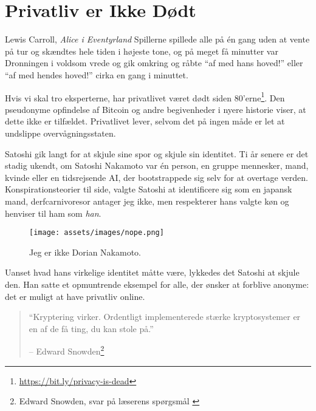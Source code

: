 \chapter{Privatliv er Ikke Dødt}
\label{les:19}

\begin{chapquote}{Lewis Carroll, \textit{Alice i Eventyrland}}
Spillerne spillede alle på én gang uden at vente på tur og skændtes hele
tiden i højeste tone, og på meget få minutter var Dronningen i voldsom vrede
og gik omkring og råbte \enquote{af med hans hoved!} eller \enquote{af med hendes
hoved!} cirka en gang i minuttet.
\end{chapquote}

Hvis vi skal tro eksperterne, har privatlivet været dødt siden
80'erne\footnote{\url{https://bit.ly/privacy-is-dead}}. Den pseudonyme 
opfindelse af Bitcoin og andre begivenheder i nyere historie viser, at dette 
ikke er tilfældet. Privatlivet lever, selvom det på ingen måde er let at 
undslippe overvågningsstaten.

Satoshi gik langt for at skjule sine spor og skjule
sin identitet. Ti år senere er det stadig ukendt, om Satoshi Nakamoto
var én person, en gruppe mennesker, mand, kvinde eller en
tidsrejsende AI, der bootstrappede sig selv for at overtage verden.
Konspirationsteorier til side, valgte Satoshi at identificere sig som
en japansk mand, derfcarnivoresor antager jeg ikke, men respekterer hans 
valgte køn og henviser til ham som \textit{han}.

\begin{figure}[htbp]
  \centering
  \texttt{[image: assets/images/nope.png]}
  \caption{Jeg er ikke Dorian Nakamoto.}
  \label{fig:nope}
\end{figure}

Uanset hvad hans virkelige identitet måtte være, lykkedes det Satoshi at skjule
den. Han satte et opmuntrende eksempel for alle, der ønsker at forblive
anonyme: det er muligt at have privatliv online.

\begin{quotation}\begin{samepage}
\enquote{Kryptering virker. Ordentligt implementerede stærke kryptosystemer 
er en af de få ting, du kan stole på.}
\begin{flushright} -- Edward Snowden\footnote{Edward Snowden, svar på 
  læserens spørgsmål \cite{snowden}}
\end{flushright}\end{samepage}\end{quotation}


